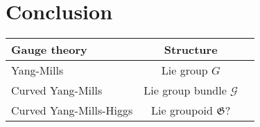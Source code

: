 \documentclass[hyperref={pdfpagelabels=false}]{beamer}
\theoremstyle{plain}
\theoremstyle{remark}
\newtheorem*{remark}{Remarks}
\begin{document}
\section{Conclusion}
{
%
%

\begin{frame}
\begin{table}[h!]
		\begin{tabularx}{\textwidth}{X| c c} 
			\rowcolor{gray}
			Gauge theory & Structure \\ \hline
			Yang-Mills & Lie group $G$ \\
			\rowcolor{Gray}
			Curved Yang-Mills & Lie group bundle $\mathcal{G}$ \\ 
			Curved Yang-Mills-Higgs & Lie groupoid $\mathfrak{G}$?
		\end{tabularx}
\end{table}


\end{frame}}
\end{document}
